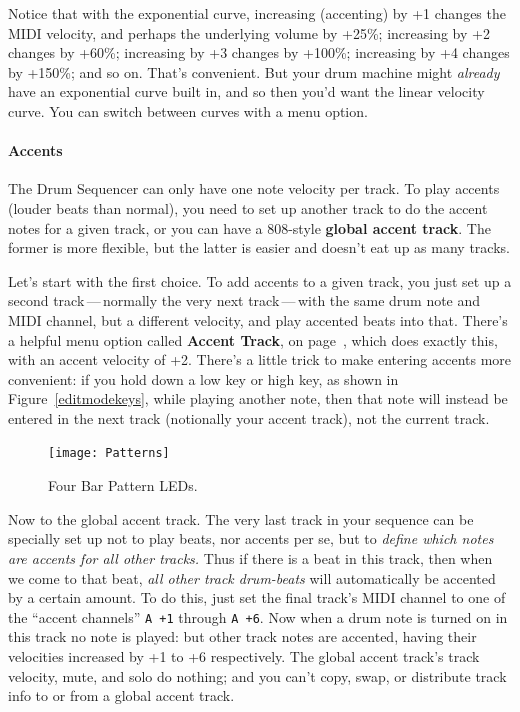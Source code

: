 \documentclass{article}
\begin{document}
Notice that with the exponential curve, increasing (accenting) by +1 changes the MIDI velocity, and perhaps the underlying volume by +25\%; increasing by +2 changes by +60\%; increasing by +3 changes by +100\%; increasing by +4 changes by +150\%; and so on.  That's convenient.  But your drum machine might {\it already} have an exponential curve built in, and so then you'd want the linear velocity curve.  You can switch between curves with a menu option.


\paragraph{Accents}  The Drum Sequencer can only have one note velocity per track.  To play accents (louder beats than normal), you need to set up another track to do the accent notes for a given track, or you can have a 808-style {\bf global accent track}.  The former is more flexible, but the latter is easier and doesn't eat up as many tracks.

Let's start with the first choice.  To add accents to a given track, you just set up a second track\,---\,normally the very next track\,---\,with the same drum note and MIDI channel, but a different velocity, and play accented beats into that.  There's a helpful menu option called {\bf Accent Track}, on page~\pageref*{accenttrack}, which does exactly this, with an accent velocity of +2.  There's a little trick to make entering accents more convenient: if you hold down a low key or high key, as shown in Figure~\ref{editmodekeys}, while playing another note, then that note will instead be entered in the next track (notionally your accent track), not the current track. 

\begin{figure}
\vspace{-1em}\hspace{\fill}\texttt{[image: Patterns]}\hspace{\fill}
\caption{\small Four Bar Pattern LEDs.}
\vspace{-2em}
\label{bars2}
\end{figure}

Now to the global accent track.  The very last track in your sequence can be specially set up not to play beats, nor accents per se, but to {\it define which notes are accents for all other tracks.}  Thus if there is a beat in this track, then when we come to that beat, {\it all other track drum-beats} will automatically be accented by a certain amount.  To do this, just set the final track's MIDI channel to one of the ``accent channels'' {\tt A +1} through {\tt A +6}.  Now when a drum note is turned on in this track no note is played: but other track notes are accented, having their velocities increased by +1 to +6 respectively.  The global accent track's track velocity, mute, and solo do nothing; and you can't copy, swap, or distribute track info to or from a global accent track.
\end{document}

